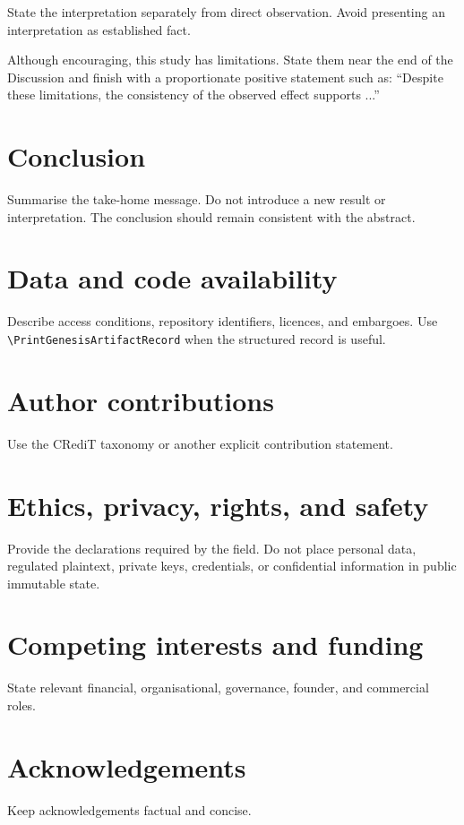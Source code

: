 \documentclass[
  blockchain,
  computerscience,
  chemistry,
  biochemistry,
  biology
]{genesisl1-paper}
\begin{document}
\begin{GenesisInterpretation}
State the interpretation separately from direct observation. Avoid presenting an
interpretation as established fact.
\end{GenesisInterpretation}

\begin{GenesisLimitations}
Although encouraging, this study has limitations. State them near the end of the
Discussion and finish with a proportionate positive statement such as:
``Despite these limitations, the consistency of the observed effect supports ...''
\end{GenesisLimitations}

\section{Conclusion}
Summarise the take-home message. Do not introduce a new result or interpretation.
The conclusion should remain consistent with the abstract.

\section*{Data and code availability}
Describe access conditions, repository identifiers, licences, and embargoes. Use
\verb|\PrintGenesisArtifactRecord| when the structured record is useful.


\section*{Author contributions}
Use the CRediT taxonomy or another explicit contribution statement.

\section*{Ethics, privacy, rights, and safety}
Provide the declarations required by the field. Do not place personal data, regulated
plaintext, private keys, credentials, or confidential information in public immutable state.

\section*{Competing interests and funding}
State relevant financial, organisational, governance, founder, and commercial roles.

\section*{Acknowledgements}
Keep acknowledgements factual and concise.

\GenesisEndMatterNotice



\end{document}
